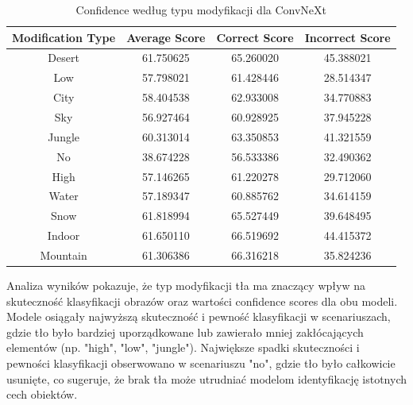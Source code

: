 \begin{table}
	\centering
	\begin{tabular}{|c|c|c|c|}
		\hline
		\textbf{Modification Type} & \textbf{Average Score} & \textbf{Correct Score} & \textbf{Incorrect Score} \\
		\hline
		Desert & 61.750625 & 65.260020 & 45.388021 \\
		\hline
		Low & 57.798021 & 61.428446 & 28.514347 \\
		\hline
		City & 58.404538 & 62.933008 & 34.770883 \\
		\hline
		Sky & 56.927464 & 60.928925 & 37.945228 \\
		\hline
		Jungle & 60.313014 & 63.350853 & 41.321559 \\
		\hline
		No & 38.674228 & 56.533386 & 32.490362 \\
		\hline
		High & 57.146265 & 61.220278 & 29.712060 \\
		\hline
		Water & 57.189347 & 60.885762 & 34.614159 \\
		\hline
		Snow & 61.818994 & 65.527449 & 39.648495 \\
		\hline
		Indoor & 61.650110 & 66.519692 & 44.415372 \\
		\hline
		Mountain & 61.306386 & 66.316218 & 35.824236 \\
		\hline
	\end{tabular}
	\caption{Confidence według typu modyfikacji dla ConvNeXt}
	\label{tab:convnext_confidence_modification}
\end{table}

Analiza wyników pokazuje, że typ modyfikacji tła ma znaczący wpływ na skuteczność klasyfikacji obrazów oraz wartości confidence scores dla obu 
modeli. Modele osiągały najwyższą skuteczność i pewność klasyfikacji w scenariuszach, gdzie tło było bardziej uporządkowane lub zawierało mniej 
zakłócających elementów (np. "high", "low", "jungle"). Największe spadki skuteczności i pewności klasyfikacji obserwowano w scenariuszu "no", 
gdzie tło było całkowicie usunięte, co sugeruje, że brak tła może utrudniać modelom identyfikację istotnych cech obiektów.

